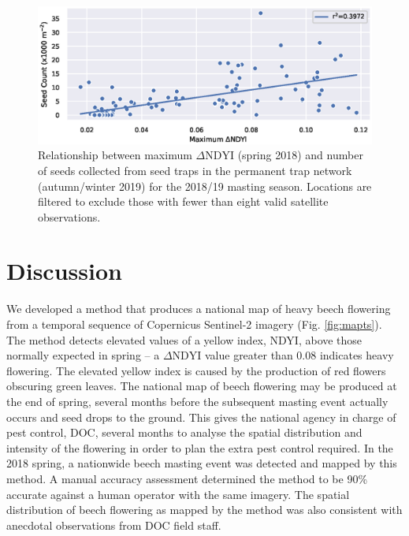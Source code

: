 \documentclass[remotesensing,article,submit,moreauthors,pdftex]{Definitions/mdpi}
\begin{document}
\begin{figure}
    \centering
    \includegraphics[width=\textwidth]{images/figure4_scatter_ndyi_seed_2018-2019.eps}
    \caption{Relationship between maximum $\Delta\text{NDYI}$ (spring 2018) and number of seeds collected from seed traps in the permanent trap network (autumn/winter 2019) for the 2018/19 masting season. Locations are filtered to exclude those with fewer than eight valid satellite observations.}
    \label{fig:trayscatter1819}
\end{figure}   


\section{Discussion}

We developed a method that produces a national map of heavy beech flowering from a temporal sequence of Copernicus Sentinel-2
imagery (Fig. \ref{fig:mapts}). The method detects elevated values of a yellow index, NDYI, above those normally expected in spring -- a
$\Delta\text{NDYI}$ value greater than 0.08 indicates heavy flowering. The elevated yellow index is caused by the
production of red flowers obscuring green leaves. The national map of beech flowering may be produced at the end of
spring, several months before the subsequent masting event actually occurs and seed drops to the ground. This gives the
national agency in charge of pest control, DOC, several months to analyse the spatial distribution and intensity of the flowering in order to
plan the extra pest control required. In the 2018 spring, a nationwide beech masting event was detected and mapped by
this method. A manual accuracy assessment determined the method to be 90\% accurate against a human operator with the same imagery. The spatial distribution of beech flowering as mapped by the method was also consistent with anecdotal
observations from DOC field staff.
\end{document}

